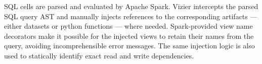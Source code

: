 
%
SQL cells are parsed and evaluated by Apache Spark.
Vizier intercepts the parsed SQL query AST and manually injects references to the corresponding artifacts --- either datasets or python functions --- where needed.
Spark-provided view name decorators make it possible for the injected views to retain their names from the query, avoiding incomprehensible error messages.
The same injection logic is also used to statically identify exact read and write dependencies.





